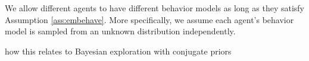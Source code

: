 We allow different agents to have different behavior models as long as they satisfy Assumption \ref{ass:embehave}. More specifically, we assume each agent's behavior model is sampled from an unknown distribution independently. 
\begin{remark}
how this relates to Bayesian exploration with conjugate priors
\end{remark}